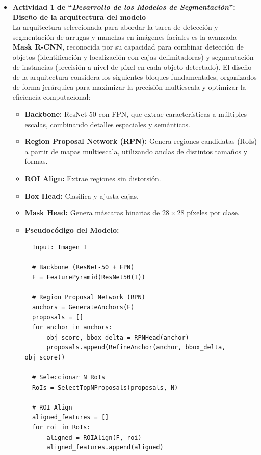 \begin{enumerate}
\begin{itemize}
 
  \item\textbf{Actividad 1 de “\textit{Desarrollo de los Modelos de Segmentación}”: Diseño de la arquitectura del modelo}
\\
La arquitectura seleccionada para abordar la tarea de detección y segmentación de arrugas y manchas en imágenes faciales es la avanzada \textbf{Mask R-CNN}, reconocida por su capacidad para combinar detección de objetos (identificación y localización con cajas delimitadoras) y segmentación de instancias (precisión a nivel de píxel en cada objeto detectado). El diseño de la arquitectura considera los siguientes bloques fundamentales, organizados de forma jerárquica para maximizar la precisión multiescala y optimizar la eficiencia computacional:

\begin{itemize}
\item \textbf{Backbone:} ResNet-50 con FPN, que extrae características a múltiples escalas, combinando detalles espaciales y semánticos.

\item \textbf{Region Proposal Network (RPN):} Genera regiones candidatas (RoIs) a partir de mapas multiescala, utilizando anclas de distintos tamaños y formas.

\item \textbf{ROI Align:} Extrae regiones sin distorsión.

\item \textbf{Box Head:} Clasifica y ajusta cajas.

\item \textbf{Mask Head:} Genera máscaras binarias de $28 \times 28$ píxeles por clase.

\item \textbf{Pseudocódigo del Modelo:}

\begin{verbatim}
  Input: Imagen I
  
  # Backbone (ResNet-50 + FPN)
  F = FeaturePyramid(ResNet50(I))  
  
  # Region Proposal Network (RPN)
  anchors = GenerateAnchors(F)         
  proposals = []
  for anchor in anchors:
      obj_score, bbox_delta = RPNHead(anchor)  
      proposals.append(RefineAnchor(anchor, bbox_delta, obj_score))
  
  # Seleccionar N RoIs
  RoIs = SelectTopNProposals(proposals, N)
  
  # ROI Align
  aligned_features = []
  for roi in RoIs:
      aligned = ROIAlign(F, roi)
      aligned_features.append(aligned)
  

\end{verbatim}
\end{itemize}
\end{itemize}
\end{enumerate}
